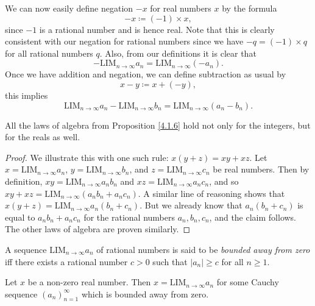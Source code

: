 \begin{note}
We can now easily define negation \(-x\) for real numbers \(x\) by the formula
\[
    -x \coloneqq (-1) \times x,
\]
since \(-1\) is a rational number and is hence real.
Note that this is clearly consistent with our negation for rational numbers since we have \(-q = (-1) \times q\) for all rational numbers \(q\).
Also, from our definitions it is clear that
\[
    -\text{LIM}_{n \to \infty} a_n = \text{LIM}_{n \to \infty} (-a_n).
\]
Once we have addition and negation, we can define subtraction as usual by
\[
    x - y \coloneqq x + (-y),
\]
this implies
\[
    \text{LIM}_{n \to \infty} a_n - \text{LIM}_{n \to \infty} b_n = \text{LIM}_{n \to \infty} (a_n - b_n).
\]
\end{note}

\begin{proposition}\label{5.3.11}
All the laws of algebra from Proposition \ref{4.1.6} hold not only for the integers, but for the reals as well.
\end{proposition}

\begin{proof}
We illustrate this with one such rule: \(x(y + z) = xy + xz\).
Let \(x = \text{LIM}_{n \to \infty} a_n\), \(y = \text{LIM}_{n \to \infty} b_n\), and \(z = \text{LIM}_{n \to \infty} c_n\) be real numbers.
Then by definition, \(xy = \text{LIM}_{n \to \infty} a_n b_n\) and \(xz = \text{LIM}_{n \to \infty} a_n c_n\), and so \(xy + xz = \text{LIM}_{n \to \infty} (a_n b_n + a_n c_n)\).
A similar line of reasoning shows that \(x(y + z) = \text{LIM}_{n \to \infty} a_n (b_n + c_n)\).
But we already know that \(a_n (b_n + c_n)\) is equal to \(a_n b_n + a_n c_n\) for the rational numbers \(a_n, b_n, c_n\), and the claim follows.
The other laws of algebra are proven similarly.
\end{proof}

\begin{definition}\label{5.3.12}
A sequence \(\text{LIM}_{n \to \infty} a_n\) of rational numbers is said to be \emph{bounded away from zero} iff there exists a rational number \(c > 0\) such that \(|a_n| \geq c\) for all \(n \geq 1\).
\end{definition}

\setcounter{theorem}{13}
\begin{lemma}\label{5.3.14}
Let \(x\) be a non-zero real number.
Then \(x = \text{LIM}_{n \to \infty} a_n\) for some Cauchy sequence \((a_n)_{n = 1}^{\infty}\) which is bounded away from zero.
\end{lemma}

